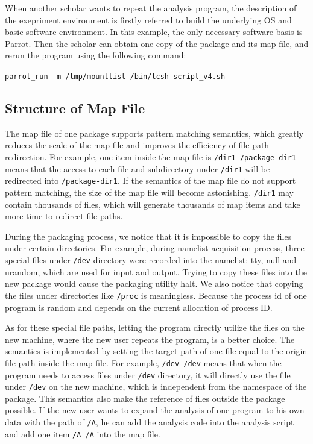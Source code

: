 \documentclass{acm_proc_article-sp}
\begin{document}
When another scholar wants to repeat the analysis program, 
the description of the exepriment environment is firstly referred to build the underlying OS and basic software environment. In this example, the only necessary software basis is Parrot. Then the scholar can obtain one copy of the package and its map file, and rerun the program using the following command:

{\tt parrot\_run -m /tmp/mountlist /bin/tcsh script\_v4.sh}

\subsection{Structure of Map File} 

The map file of one package supports pattern matching semantics,
which greatly reduces the scale of the map file and improves the efficiency of file path redirection. 
For example,
one item inside the map file is {\tt /dir1 /package-dir1} means that the access to each file and
subdirectory under {\tt /dir1} will be redirected into {\tt /package-dir1}.
If the semantics of the map file do not support pattern matching, the size of the map file will become astonishing. 
{\tt /dir1} may contain thousands of files, which will generate thousands of map items and take more time to redirect file paths.

During the packaging process, we notice
that it is impossible to copy the files under certain directories.
For example, during namelist acquisition process, three special files under {\tt /dev} directory were recorded into the namelist: tty, null and urandom, which are used for input and output.
Trying to copy these files into the new package would cause the packaging utility halt.
We also notice that copying the files under directories like {\tt /proc} is
meaningless. Because the process id of one program is random and depends on the
current allocation of process ID. 

As for these special file paths, letting
the program directly utilize the files on the new machine, where the new user
repeats the program, is a better choice. The semantics is implemented by
setting the target path of one file equal to the origin file path inside the
map file. For example, {\tt /dev /dev} means that when the program needs to access
files under {\tt /dev} directory, it will directly use the file under {\tt /dev} on the new machine, which is
independent from the namespace of the package. This semantics also make the
reference of files outside the package possible. If the new user wants to
expand the analysis of one program to his own data with the path of {\tt /A}, he can add the analysis
code into the analysis script and add one item {\tt /A /A} into the map file.
\end{document}
